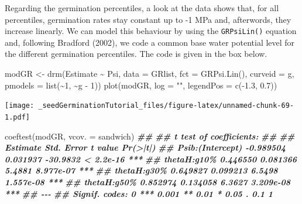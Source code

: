 \documentclass[
]{book}
\newenvironment{Shaded}{\begin{snugshade}}{\end{snugshade}}
\newcommand{\AttributeTok}[1]{\textcolor[rgb]{0.77,0.63,0.00}{#1}}
\newcommand{\DecValTok}[1]{\textcolor[rgb]{0.00,0.00,0.81}{#1}}
\newcommand{\DocumentationTok}[1]{\textcolor[rgb]{0.56,0.35,0.01}{\textbf{\textit{#1}}}}
\newcommand{\FloatTok}[1]{\textcolor[rgb]{0.00,0.00,0.81}{#1}}
\newcommand{\FunctionTok}[1]{\textcolor[rgb]{0.00,0.00,0.00}{#1}}
\newcommand{\NormalTok}[1]{#1}
\newcommand{\OtherTok}[1]{\textcolor[rgb]{0.56,0.35,0.01}{#1}}
\newcommand{\SpecialCharTok}[1]{\textcolor[rgb]{0.00,0.00,0.00}{#1}}
\newcommand{\StringTok}[1]{\textcolor[rgb]{0.31,0.60,0.02}{#1}}
\begin{document}
Regarding the germination percentiles, a look at the data shows that, for all percentiles, germination rates stay constant up to -1 MPa and, afterwords, they increase linearly. We can model this behaviour by using the \texttt{GRPsiLin()} equation and, following Bradford (2002), we code a common base water potential level for the different germination percentiles. The code is given in the box below.

\begin{Shaded}
\begin{Highlighting}[]
\NormalTok{modGR }\OtherTok{\textless{}{-}} \FunctionTok{drm}\NormalTok{(Estimate }\SpecialCharTok{\textasciitilde{}}\NormalTok{ Psi, }\AttributeTok{data =}\NormalTok{ GRlist,}
               \AttributeTok{fct =} \FunctionTok{GRPsi.Lin}\NormalTok{(), }\AttributeTok{curveid =}\NormalTok{ g,}
             \AttributeTok{pmodels =} \FunctionTok{list}\NormalTok{(}\SpecialCharTok{\textasciitilde{}}\DecValTok{1}\NormalTok{, }\SpecialCharTok{\textasciitilde{}}\NormalTok{g }\SpecialCharTok{{-}} \DecValTok{1}\NormalTok{))}
\FunctionTok{plot}\NormalTok{(modGR, }\AttributeTok{log =} \StringTok{""}\NormalTok{,}
             \AttributeTok{legendPos =} \FunctionTok{c}\NormalTok{(}\SpecialCharTok{{-}}\FloatTok{1.3}\NormalTok{, }\FloatTok{0.7}\NormalTok{))}
\end{Highlighting}
\end{Shaded}

\texttt{[image: \_seedGerminationTutorial\_files/figure-latex/unnamed-chunk-69-1.pdf]}

\begin{Shaded}
\begin{Highlighting}[]
\FunctionTok{coeftest}\NormalTok{(modGR, }\AttributeTok{vcov. =}\NormalTok{ sandwich)}
\DocumentationTok{\#\# }
\DocumentationTok{\#\# t test of coefficients:}
\DocumentationTok{\#\# }
\DocumentationTok{\#\#                   Estimate Std. Error  t value  Pr(\textgreater{}|t|)    }
\DocumentationTok{\#\# Psib:(Intercept) {-}0.989504   0.031937 {-}30.9832 \textless{} 2.2e{-}16 ***}
\DocumentationTok{\#\# thetaH:g10\%       0.446550   0.081366   5.4881 8.977e{-}07 ***}
\DocumentationTok{\#\# thetaH:g30\%       0.649827   0.099213   6.5498 1.557e{-}08 ***}
\DocumentationTok{\#\# thetaH:g50\%       0.852974   0.134058   6.3627 3.209e{-}08 ***}
\DocumentationTok{\#\# {-}{-}{-}}
\DocumentationTok{\#\# Signif. codes:  0 \textquotesingle{}***\textquotesingle{} 0.001 \textquotesingle{}**\textquotesingle{} 0.01 \textquotesingle{}*\textquotesingle{} 0.05 \textquotesingle{}.\textquotesingle{} 0.1 \textquotesingle{} \textquotesingle{} 1}
\end{Highlighting}
\end{Shaded}
\end{document}
